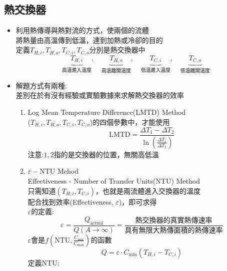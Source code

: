 \documentclass[../main.tex]{subfiles}
\begin{document}
\subsection{熱交換器}
\begin{itemize}
  \item 利用熱傳導與熱對流的方式，使兩個的流體\\
  將熱量由高溫傳到低溫，達到加熱或冷卻的目的\\
  定義$T_{H,i},T_{H,o},T_{C,i},T_{C,o}$分別是熱交換器中
  \begin{equation}
    \underbrace{T_{H,i}}_{\text{高溫進入溫度}},\quad
    \underbrace{T_{H,o}}_{\text{高溫離開溫度}},\quad
    \underbrace{T_{C,i}}_{\text{低溫進入溫度}},\quad
    \underbrace{T_{C,o}}_{\text{低溫離開溫度}}
  \end{equation}
  \item 解題方式有兩種:\\
  差別在於有沒有經驗或實驗數據來求解熱交換器的效率
  \begin{enumerate}
    \item Log Mean Temperature Difference(LMTD) Method\\
    ($T_{H,i},T_{H,o},T_{C,i},T_{C,o}$)的四個參數中，才能使用
    \begin{equation}
      \text{LMTD} = \frac{\Delta T_1-\Delta T_2}{\ln\left(\frac{\Delta T_1}{\Delta T_2}\right)}
    \end{equation}
    注意:$1,2$指的是交換器的位置，無關高低溫
    \item $\varepsilon-\text{NTU}$ Mehod\\
    Effectiveness - Number of Transfer Units(NTU) Method\\
    只需知道$(T_{H,i},T_{C,i})$，也就是兩流體進入交換器的溫度\\
    配合找到效率(Effectiveness, $\varepsilon$)，即可求得\\
    $\varepsilon$的定義:
    \begin{equation}
      \varepsilon = \frac{Q_{\text{actual}}}{Q(A\to\infty)} = \frac{\text{熱交換器的真實熱傳速率}}{\text{具有無限大熱傳面積的熱傳速率}}
    \end{equation}
    $\varepsilon$會是$f(\text{NTU},\frac{C_\text{min}}{C_\text{max}})$的函數
    \begin{equation}
      \boxed{Q = \varepsilon \cdot C_{\text{min}}\left(T_{H,i}-T_{C,i}\right)}
    \end{equation}
    定義NTU:
    \begin{equation}

\end{equation}
\end{enumerate}
\end{itemize}
\end{document}
